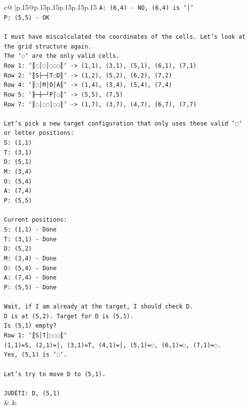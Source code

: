 \documentclass{article}
\begin{document}
{\begin{supertabular}{c@{$\;$}|p{.15\linewidth}@{}p{.15\linewidth}p{.15\linewidth}p{.15\linewidth}p{.15\linewidth}p{.15\linewidth}}
{{{\texttt{A: (6,4) {-} NO, (6,4) is `│`} \\
\texttt{P: (5,5) {-} OK} \\
\\ 
\texttt{I must have miscalculated the coordinates of the cells. Let's look at the grid structure again.} \\
\texttt{The `◌` are the only valid cells.} \\
\texttt{Row 1: `║◌│◌│◌◌◌║` {-}> (1,1), (3,1), (5,1), (6,1), (7,1)} \\
\texttt{Row 2: `║S├─┤T◌D║` {-}> (1,2), (5,2), (6,2), (7,2)} \\
\texttt{Row 4: `║◌│M│O│A║` {-}> (1,4), (3,4), (5,4), (7,4)} \\
\texttt{Row 5: `╟─┼─┘P│◌║` {-}> (5,5), (7,5)} \\
\texttt{Row 7: `║◌│◌◌│◌◌║` {-}> (1,7), (3,7), (4,7), (6,7), (7,7)} \\
\\ 
\texttt{Let's pick a new target configuration that only uses these valid `◌` or letter positions:} \\
\texttt{S: (1,1)} \\
\texttt{T: (3,1)} \\
\texttt{D: (5,1)} \\
\texttt{M: (3,4)} \\
\texttt{O: (5,4)} \\
\texttt{A: (7,4)} \\
\texttt{P: (5,5)} \\
\\ 
\texttt{Current positions:} \\
\texttt{S: (1,1) {-} Done} \\
\texttt{T: (3,1) {-} Done} \\
\texttt{D: (5,2)} \\
\texttt{M: (3,4) {-} Done} \\
\texttt{O: (5,4) {-} Done} \\
\texttt{A: (7,4) {-} Done} \\
\texttt{P: (5,5) {-} Done} \\
\\ 
\texttt{Wait, if I am already at the target, I should check D.} \\
\texttt{D is at (5,2). Target for D is (5,1).} \\
\texttt{Is (5,1) empty?} \\
\texttt{Row 1: `║S│T│◌◌◌║`} \\
\texttt{(1,1)=S, (2,1)=│, (3,1)=T, (4,1)=│, (5,1)=◌, (6,1)=◌, (7,1)=◌.} \\
\texttt{Yes, (5,1) is `◌`.} \\
\\ 
\texttt{Let's try to move D to (5,1).} \\
\\ 
\texttt{JUDĖTI: D, (5,1)} \\
            }
        }
    }
    & & \\ \\


\end{supertabular}}
\end{document}
